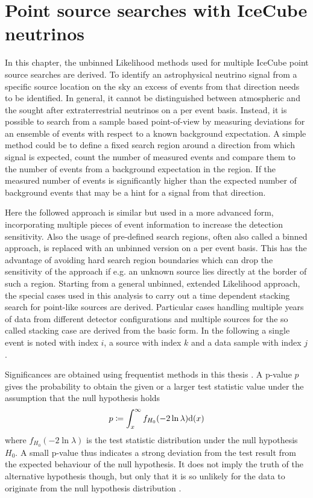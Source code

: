 \chapter{Point source searches with IceCube neutrinos}
In this chapter, the unbinned Likelihood methods used for multiple IceCube point source searches are derived.
To identify an astrophysical neutrino signal from a specific source location on the sky an excess of events from that direction needs to be identified.
In general, it cannot be distinguished between atmospheric and the sought after extraterrestrial neutrinos on a per event basis.
Instead, it is possible to search from a sample based point-of-view by measuring deviations for an ensemble of events with respect to a known background expectation.
A simple method could be to define a fixed search region around a direction from which signal is expected, count the number of measured events and compare them to the number of events from a background expectation in the region.
If the measured number of events is significantly higher than the expected number of background events that may be a hint for a signal from that direction.

Here the followed approach is similar but used in a more advanced form, incorporating multiple pieces of event information to increase the detection sensitivity.
Also the usage of pre-defined search regions, often also called a binned approach, is replaced with an unbinned version on a per event basis.
This has the advantage of avoiding hard search region boundaries which can drop the sensitivity of the approach if e.g. an unknown source lies directly at the border of such a region.
Starting from a general unbinned, extended Likelihood approach, the special cases used in this analysis to carry out a time dependent stacking search for point-like sources are derived.
Particular cases handling multiple years of data from different detector configurations and multiple sources for the so called stacking case are derived from the basic form.
In the following a single event is noted with index $i$, a source with index $k$ and a data sample with index $j$.

Significances are obtained using frequentist methods in this thesis .
A p-value $p$ gives the probability to obtain the given or a larger test statistic value under the assumption that the null hypothesis holds
\begin{equation}
  p \coloneqq \int_x^\infty f_{H_0}(-2\ln\lambda) \mathrm{d}(x)
\end{equation}
where $f_{H_0}(-2\ln\lambda)$ is the test statistic distribution under the null hypothesis $H_0$.
A small p-value thus indicates a strong deviation from the test result from the expected behaviour of the null hypothesis.
It does not imply the truth of the alternative hypothesis though, but only that it is so unlikely for the data to originate from the null hypothesis distribution .

